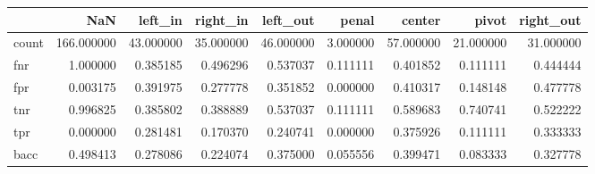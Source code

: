 \begin{tabular}{lrrrrrrrr}
\toprule
{} &         NaN &    left\_in &   right\_in &   left\_out &     penal &     center &      pivot &  right\_out \\
\midrule
count &  166.000000 &  43.000000 &  35.000000 &  46.000000 &  3.000000 &  57.000000 &  21.000000 &  31.000000 \\
fnr   &    1.000000 &   0.385185 &   0.496296 &   0.537037 &  0.111111 &   0.401852 &   0.111111 &   0.444444 \\
fpr   &    0.003175 &   0.391975 &   0.277778 &   0.351852 &  0.000000 &   0.410317 &   0.148148 &   0.477778 \\
tnr   &    0.996825 &   0.385802 &   0.388889 &   0.537037 &  0.111111 &   0.589683 &   0.740741 &   0.522222 \\
tpr   &    0.000000 &   0.281481 &   0.170370 &   0.240741 &  0.000000 &   0.375926 &   0.111111 &   0.333333 \\
bacc  &    0.498413 &   0.278086 &   0.224074 &   0.375000 &  0.055556 &   0.399471 &   0.083333 &   0.327778 \\
\bottomrule
\end{tabular}

